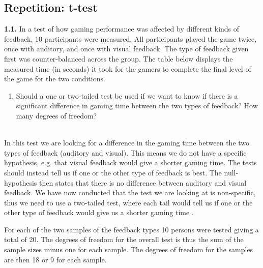 \subsection{Repetition: t-test}
\noindent\colorbox{light-gray}{\begin{minipage}{0.98\textwidth}
\textbf{1.1.} In a test of how gaming performance was affected by different kinds of feedback, 10 participants were measured. All participants played the game twice, once with auditory, and once with visual feedback. The type of feedback given first was counter-balanced across the group. The table below displays the measured time (in seconds) it took for the gamers to complete the final level of the game for the two conditions.
\end{minipage}}

\noindent\colorbox{lighter-gray}{\begin{minipage}{0.98\textwidth}
\begin{enumerate}[label=\textbf{(\arabic*)}]\setcounter{enumi}{0}
	\item Should a one or two-tailed test be used if we want to know if there is a significant difference in gaming time between the two types of feedback? How many degrees of freedom?
\end{enumerate}\end{minipage}}

\hspace{0pt} \\
In this test we are looking for a difference in the gaming time between the two types of feedback (auditory and visual). This means we do not have a specific hypothesis, e.g. that visual feedback would give a shorter gaming time. The tests should instead tell us if one or the other type of feedback is best. The null-hypothesis then states that there is no difference between auditory and visual feedback. We have now conducted that the test we are looking at is non-specific, thus we need to use a two-tailed test, where each tail would tell us if one or the other type of feedback would give us a shorter gaming time \citep[pp. 155-156]{Design}.

For each of the two samples of the feedback types 10 persons were tested giving a total of 20. The degrees of freedom for the overall test is thus the sum of the sample sizes minus one for each sample. The degrees of freedom for the samples are then 18 or 9 for each sample.

